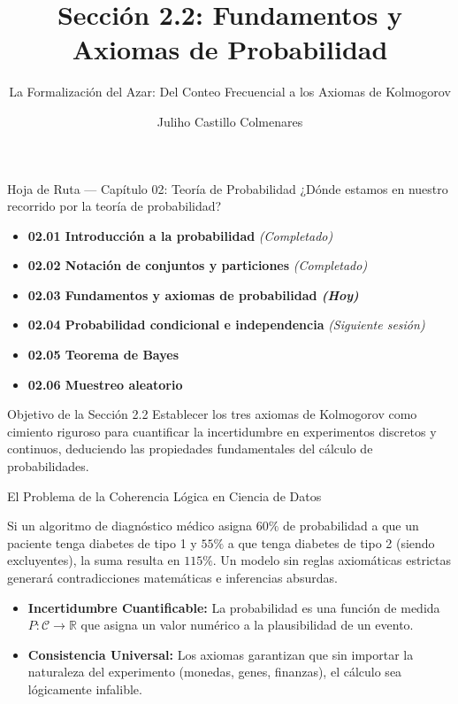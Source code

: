 \documentclass[10pt,aspectratio=169]{beamer}
\title[Fundamentos y Axiomas]{Sección 2.2: Fundamentos y Axiomas de Probabilidad}
\subtitle{La Formalización del Azar: Del Conteo Frecuencial a los Axiomas de Kolmogorov}
\author[J. Castillo Colmenares]{Juliho Castillo Colmenares}
\institute{Tecnológico de Monterrey}
\date{}
\begin{document}
\begin{frame}[plain]
  \vspace{-0.8cm}
  \titlepage
\end{frame}

\begin{frame}{Hoja de Ruta — Capítulo 02: Teoría de Probabilidad}
  ¿Dónde estamos en nuestro recorrido por la teoría de probabilidad? \pause
  \begin{itemize}
    \item \textbf{02.01 Introducción a la probabilidad} \emph{(Completado)} \pause
    \item \textbf{02.02 Notación de conjuntos y particiones} \emph{(Completado)} \pause
    \item \color{TecRojo}\textbf{02.03 Fundamentos y axiomas de probabilidad \emph{(Hoy)}}\color{black} \pause
    \item \textbf{02.04 Probabilidad condicional e independencia} \emph{(Siguiente sesión)} \pause
    \item \textbf{02.05 Teorema de Bayes} \pause
    \item \textbf{02.06 Muestreo aleatorio}
  \end{itemize}
  \vspace{0.6em}
  \begin{block}{Objetivo de la Sección 2.2}
    Establecer los tres axiomas de Kolmogorov como cimiento riguroso para cuantificar la incertidumbre en experimentos discretos y continuos, deduciendo las propiedades fundamentales del cálculo de probabilidades.
  \end{block}
\end{frame}

\begin{frame}{El Problema de la Coherencia Lógica en Ciencia de Datos}
  \begin{motivacion}
    Si un algoritmo de diagnóstico médico asigna $60\%$ de probabilidad a que un paciente tenga diabetes de tipo 1 y $55\%$ a que tenga diabetes de tipo 2 (siendo excluyentes), la suma resulta en $115\%$. Un modelo sin reglas axiomáticas estrictas generará contradicciones matemáticas e inferencias absurdas.
  \end{motivacion}
  
  \vspace{0.4em}
  \pause
  \begin{itemize}
    \item \textbf{Incertidumbre Cuantificable:} La probabilidad es una función de medida $P: \mathcal{C} \to \mathbb{R}$ que asigna un valor numérico a la plausibilidad de un evento. \pause
    \item \textbf{Consistencia Universal:} Los axiomas garantizan que sin importar la naturaleza del experimento (monedas, genes, finanzas), el cálculo sea lógicamente infalible.
  \end{itemize}
\end{frame}
\end{document}
